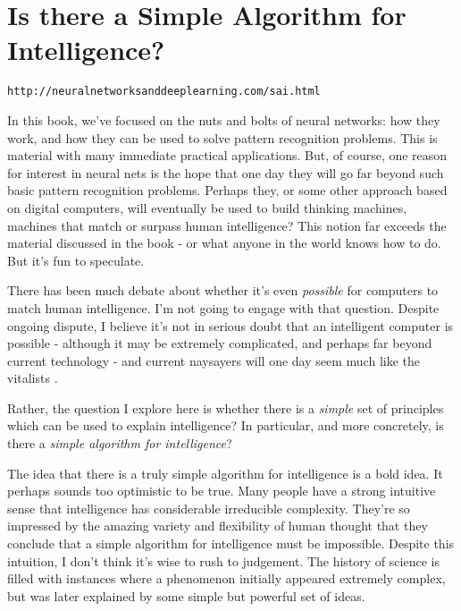 
\chapter{ Is there a Simple Algorithm for Intelligence?}
\label{sec:IsthereASimpleAlgorithmforIntelligence?}

\lstinline{http://neuralnetworksanddeeplearning.com/sai.html}

In this book, we've focused on the nuts and bolts of neural networks: how they work, and how they can be used to solve pattern recognition problems. This is material with many immediate practical applications. But, of course, one reason for interest in neural nets is the hope that one day they will go far beyond such basic pattern recognition problems. Perhaps they, or some other approach based on digital computers, will eventually be used to build thinking machines, machines that match or surpass human intelligence? This notion far exceeds the material discussed in the book - or what anyone in the world knows how to do. But it's fun to speculate.

There has been much debate about whether it's even \textit{possible} for computers to match human intelligence. I'm not going to engage with that question. Despite ongoing dispute, I believe it's not in serious doubt that an intelligent computer is possible - although it may be extremely complicated, and perhaps far beyond current technology - and current naysayers will one day seem much like the vitalists \cite{wikipediaVitalism2019}.

Rather, the question I explore here is whether there is a \textit{simple} set of principles which can be used to explain intelligence? In particular, and more concretely, is there a \textit{simple algorithm for intelligence}?

The idea that there is a truly simple algorithm for intelligence is a bold idea. It perhaps sounds too optimistic to be true. Many people have a strong intuitive sense that intelligence has considerable irreducible complexity. They're so impressed by the amazing variety and flexibility of human thought that they conclude that a simple algorithm for intelligence must be impossible. Despite this intuition, I don't think it's wise to rush to judgement. The history of science is filled with instances where a phenomenon initially appeared extremely complex, but was later explained by some simple but powerful set of ideas.

